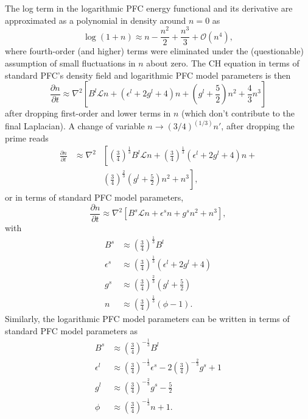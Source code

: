 \documentclass[%
 reprint,
 amsmath,amssymb,
 aps,
 prl,
]{revtex4-2}
\begin{document}
%
The log term in the logarithmic PFC energy functional and its derivative are approximated as a polynomial in density around $n = 0$ as
\begin{equation}
    \log (1 + n) \approx n -\frac{n^2}{2} + \frac{n^3}{3} + \mathcal{O}\left( n^4 \right),
\end{equation}
where fourth-order (and higher) terms were eliminated under the (questionable) assumption of small fluctuations in $n$ about zero.  The CH equation in terms of standard PFC's density field and logarithmic PFC model parameters is then
\begin{equation}
    \frac{\partial n}{\partial t} \! \approx \! \nabla^2\! \left[ B^l \mathcal{L} n + \left( \epsilon^l + 2g^l + 4 \right) n + \! \left( g^l + \frac{5}{2} \right)n^2 + \frac{4}{3} n^3 \right]
\end{equation}
%
after dropping first-order and lower terms in $n$ (which don't contribute to the final Laplacian).  A change of variable $n \rightarrow (3/4)^{(1/3)} n'$, after dropping the prime reads
\begin{align}
    \frac{\partial n}{\partial t} & \approx \nabla^2 & \left[ \left( \frac{3}{4} \right)^{\frac{1}{3}} B^l \mathcal{L} n +
    \left( \frac{3}{4} \right)^{\frac{1}{3}} \left( \epsilon^l + 2 g^l + 4 \right) n + \right. \nonumber \\
    & & \left. \left( \frac{3}{4} \right)^{\frac{2}{3}} \left( g^l + \frac{5}{2} \right) n^2 + n^3 \right],
\end{align}
%
or in terms of standard PFC model parameters,
\begin{equation}
    \frac{\partial n}{\partial t} \approx \nabla^2 \left[ B^s \mathcal{L} n + \epsilon^s n + g^s n^2 + n^3 \right],
\end{equation}
with
\begin{align}
    B^s & \approx \left( \frac{3}{4} \right)^{\frac{1}{3}} B^l \\
    \epsilon^s & \approx \left( \frac{3}{4} \right)^{\frac{1}{3}} \left( \epsilon^l + 2 g^l + 4 \right) \\
    g^s & \approx \left( \frac{3}{4} \right)^{\frac{2}{3}} \left( g^l + \frac{5}{2} \right) \\
    n & \approx \left( \frac{3}{4} \right)^{\frac{1}{3}} (\phi - 1).
\end{align}
%
Similarly, the logarithmic PFC model parameters can be written in terms of standard PFC model parameters as
\begin{align}
    B^s & \approx \left( \frac{3}{4} \right)^{-\frac{1}{3}} B^l \\
    \epsilon^l & \approx \left( \frac{3}{4} \right)^{-\frac{1}{3}} \epsilon^s - 2 \left( \frac{3}{4} \right)^{-\frac{2}{3}} g^s + 1 \\
    g^l & \approx \left( \frac{3}{4} \right)^{-\frac{2}{3}} g^s - \frac{5}{2} \\
    \phi & \approx \left( \frac{3}{4} \right)^{-\frac{1}{3}} n + 1.
\end{align}
\end{document}
